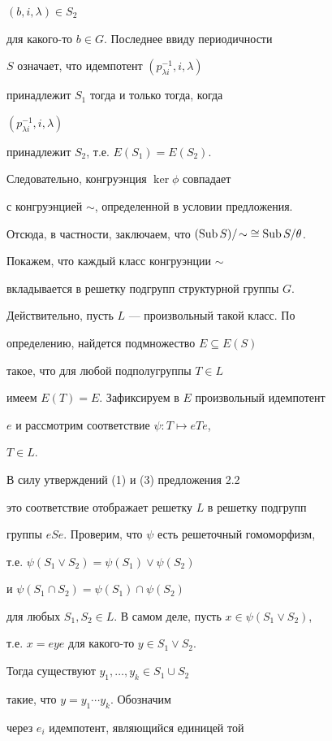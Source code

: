 \begin{pf}
$(b, i, \lambda) \in S_{2}$


для какого-то $b \in G$. Последнее ввиду периодичности


$S$ означает, что идемпотент $(p_{\lambda i}^{-1}, i, \lambda)$


принадлежит $S_1$ тогда и только тогда, когда


$(p_{\lambda i}^{-1}, i, \lambda)$


принадлежит $S_2$, т.е. $E(S_1) = E(S_2)$.


Следовательно, конгруэнция $\ker\phi$ совпадает


с конгруэнцией $\sim$, определенной в условии предложения.


Отсюда, в частности, заключаем, что $(\Sub S) /\! \sim \;


\cong\Sub S / \theta$.





Покажем, что каждый класс конгруэнции $\sim$


вкладывается в решетку подгрупп структурной группы $G$.


Действительно, пусть $L$ --- произвольный такой класс. По


определению, найдется подмножество $E \subseteq E(S)$


такое, что для любой подполугруппы $T \in L$


имеем $E(T) = E$. Зафиксируем в $E$ произвольный идемпотент


$e$ и рассмотрим соответствие $\psi: T \mapsto eTe$,


$T \in L$.


В силу утверждений (1) и (3) предложения 2.2


это соответствие отображает решетку $L$ в решетку подгрупп


группы $eSe$. Проверим, что $\psi$ есть решеточный гомоморфизм,


т.е. $\psi(S_1 \vee S_2) = \psi(S_1) \vee \psi(S_2)$


и $\psi(S_1 \cap S_2) = \psi(S_1) \cap \psi(S_2)$


для любых $S_1, S_2 \in L$. В самом деле, пусть $x \in


\psi(S_1 \vee S_2)$,


т.е. $x = eye$ для какого-то $y \in S_1 \vee S_2$.


Тогда существуют $y_1,\dotsc,y_k \in S_1 \cup S_2$


такие, что $y = y_1\dotsb y_k$. Обозначим


через $e_i$ идемпотент, являющийся единицей той



\end{pf}
